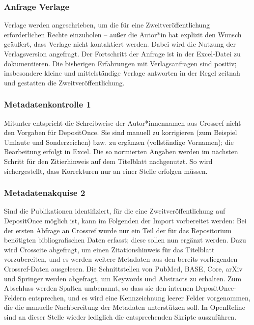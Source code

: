 \documentclass[a4paper,
fontsize=11pt,
oneside,
numbers=noperiodatend,
parskip=half-,
bibliography=totoc,
final
]{scrartcl}
\begin{document}
\hypertarget{anfrage-verlage}{%
\subsubsection{Anfrage Verlage}\label{anfrage-verlage}}

Verlage werden angeschrieben, um die für eine Zweitveröffentlichung
erforderlichen Rechte einzuholen -- außer die Autor*in hat explizit den
Wunsch geäußert, dass Verlage nicht kontaktiert werden. Dabei wird die
Nutzung der Verlagsversion angefragt. Der Fortschritt der Anfrage ist in
der Excel-Datei zu dokumentieren. Die bisherigen Erfahrungen mit
Verlagsanfragen sind positiv; insbesondere kleine und mittelständige
Verlage antworten in der Regel zeitnah und gestatten die
Zweitveröffentlichung.

\hypertarget{metadatenkontrolle-1}{%
\subsubsection{Metadatenkontrolle 1}\label{metadatenkontrolle-1}}

Mitunter entspricht die Schreibweise der Autor*innennamen aus Crossref
nicht den Vorgaben für DepositOnce. Sie sind manuell zu korrigieren (zum
Beispiel Umlaute und Sonderzeichen) bzw. zu ergänzen (vollständige
Vornamen); die Bearbeitung erfolgt in Excel. Die so normierten Angaben
werden im nächsten Schritt für den Zitierhinweis auf dem Titelblatt
nachgenutzt. So wird sichergestellt, dass Korrekturen nur an einer
Stelle erfolgen müssen.

\hypertarget{metadatenakquise-2}{%
\subsubsection{Metadatenakquise 2}\label{metadatenakquise-2}}

Sind die Publikationen identifiziert, für die eine Zweitveröffentlichung
auf DepositOnce möglich ist, kann im Folgenden der Import vorbereitet
werden: Bei der ersten Abfrage an Crossref wurde nur ein Teil der für
das Repositorium benötigten bibliografischen Daten erfasst; diese sollen
nun ergänzt werden. Dazu wird Crosscite abgefragt, um einen
Zitationshinweis für das Titelblatt vorzubereiten, und es werden weitere
Metadaten aus den bereits vorliegenden Crossref-Daten ausgelesen. Die
Schnittstellen von PubMed, BASE, Core, arXiv und Springer werden
abgefragt, um Keywords und Abstracts zu erhalten. Zum Abschluss werden
Spalten umbenannt, so dass sie den internen DepositOnce-Feldern
entsprechen, und es wird eine Kennzeichnung leerer Felder vorgenommen,
die die manuelle Nachbereitung der Metadaten unterstützen soll. In
OpenRefine sind an dieser Stelle wieder lediglich die entsprechenden
Skripte auszuführen.
\end{document}
